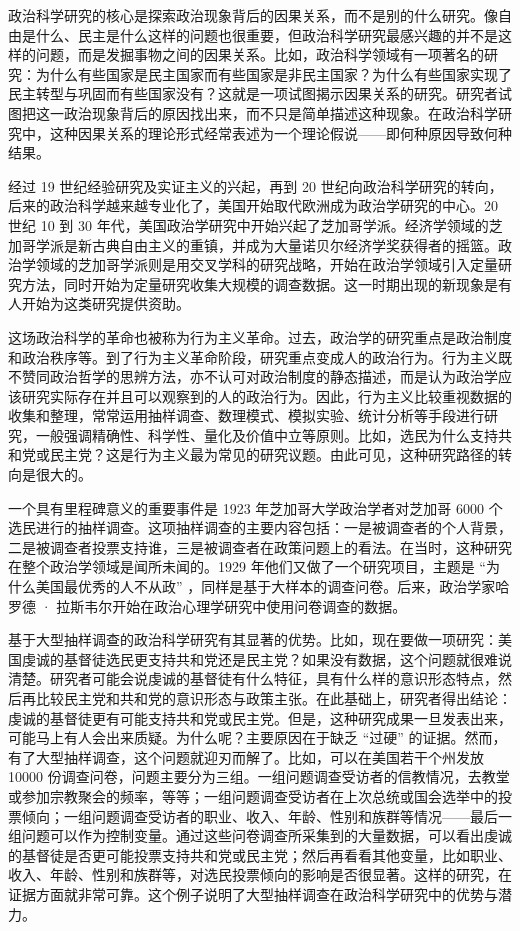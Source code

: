 政治科学研究的核心是探索政治现象背后的因果关系，而不是别的什么研究。像自由是什么、民主是什么这样的问题也很重要，但政治科学研究最感兴趣的并不是这样的问题，而是发掘事物之间的因果关系。比如，政治科学领域有一项著名的研究：为什么有些国家是民主国家而有些国家是非民主国家？为什么有些国家实现了民主转型与巩固而有些国家没有？这就是一项试图揭示因果关系的研究。研究者试图把这一政治现象背后的原因找出来，而不只是简单描述这种现象。在政治科学研究中，这种因果关系的理论形式经常表述为一个理论假说——即何种原因导致何种结果。

经过 19 世纪经验研究及实证主义的兴起，再到 20 世纪向政治科学研究的转向，后来的政治科学越来越专业化了，美国开始取代欧洲成为政治学研究的中心。20 世纪 10 到 30 年代，美国政治学研究中开始兴起了芝加哥学派。经济学领域的芝加哥学派是新古典自由主义的重镇，并成为大量诺贝尔经济学奖获得者的摇篮。政治学领域的芝加哥学派则是用交叉学科的研究战略，开始在政治学领域引入定量研究方法，同时开始为定量研究收集大规模的调查数据。这一时期出现的新现象是有人开始为这类研究提供资助。

这场政治科学的革命也被称为行为主义革命。过去，政治学的研究重点是政治制度和政治秩序等。到了行为主义革命阶段，研究重点变成人的政治行为。行为主义既不赞同政治哲学的思辨方法，亦不认可对政治制度的静态描述，而是认为政治学应该研究实际存在并且可以观察到的人的政治行为。因此，行为主义比较重视数据的收集和整理，常常运用抽样调查、数理模式、模拟实验、统计分析等手段进行研究，一般强调精确性、科学性、量化及价值中立等原则。比如，选民为什么支持共和党或民主党？这是行为主义最为常见的研究议题。由此可见，这种研究路径的转向是很大的。

一个具有里程碑意义的重要事件是 1923 年芝加哥大学政治学者对芝加哥 6000 个选民进行的抽样调查。这项抽样调查的主要内容包括：一是被调查者的个人背景，二是被调查者投票支持谁，三是被调查者在政策问题上的看法。在当时，这种研究在整个政治学领域是闻所未闻的。1929 年他们又做了一个研究项目，主题是 “为什么美国最优秀的人不从政” ，同样是基于大样本的调查问卷。后来，政治学家哈罗德 · 拉斯韦尔开始在政治心理学研究中使用问卷调查的数据。

基于大型抽样调查的政治科学研究有其显著的优势。比如，现在要做一项研究：美国虔诚的基督徒选民更支持共和党还是民主党？如果没有数据，这个问题就很难说清楚。研究者可能会说虔诚的基督徒有什么特征，具有什么样的意识形态特点，然后再比较民主党和共和党的意识形态与政策主张。在此基础上，研究者得出结论：虔诚的基督徒更有可能支持共和党或民主党。但是，这种研究成果一旦发表出来，可能马上有人会出来质疑。为什么呢？主要原因在于缺乏 “过硬” 的证据。然而，有了大型抽样调查，这个问题就迎刃而解了。比如，可以在美国若干个州发放 10000 份调查问卷，问题主要分为三组。一组问题调查受访者的信教情况，去教堂或参加宗教聚会的频率，等等；一组问题调查受访者在上次总统或国会选举中的投票倾向；一组问题调查受访者的职业、收入、年龄、性别和族群等情况——最后一组问题可以作为控制变量。通过这些问卷调查所采集到的大量数据，可以看出虔诚的基督徒是否更可能投票支持共和党或民主党；然后再看看其他变量，比如职业、收入、年龄、性别和族群等，对选民投票倾向的影响是否很显著。这样的研究，在证据方面就非常可靠。这个例子说明了大型抽样调查在政治科学研究中的优势与潜力。

